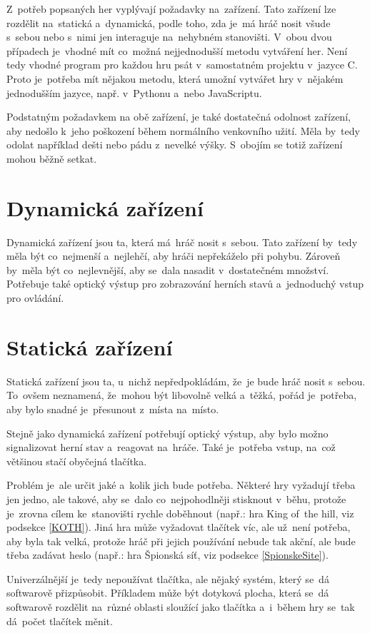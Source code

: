 Z~potřeb popsaných her vyplývají požadavky na~zařízení.
Tato zařízení lze rozdělit na~statická a~dynamická, podle toho, zda je~má hráč nosit všude s~sebou nebo s~nimi jen interaguje na~nehybném stanovišti.
V~obou dvou případech je~vhodné mít co~možná nejjednodušší metodu vytváření her.
Není tedy vhodné program pro každou hru psát v~samostatném projektu v~jazyce C.
Proto je~potřeba mít nějakou metodu, která umožní vytvářet hry v~nějakém jednodušším jazyce, např. v~Pythonu a~nebo JavaScriptu.

Podstatným požadavkem na obě zařízení, je také dostatečná odolnost zařízení, aby nedošlo k~jeho poškození během normálního venkovního užití.
Měla by~tedy odolat například dešti nebo pádu z~nevelké výšky.
S~obojím se totiž zařízení mohou běžně setkat.

\section{Dynamická zařízení}
Dynamická zařízení jsou ta, která má~hráč nosit s~sebou.
Tato zařízení by~tedy měla být co~nejmenší a~nejlehčí, aby hráči nepřekáželo při pohybu.
Zároveň by~měla být co~nejlevnější, aby se~dala nasadit v~dostatečném množství.
Potřebuje také optický výstup pro zobrazování herních stavů a~jednoduchý vstup pro ovládání. 

\section{Statická zařízení}
Statická zařízení jsou ta, u~nichž nepředpokládám, že~je bude hráč nosit s~sebou.
To~ovšem neznamená, že~mohou být libovolně velká a~těžká, pořád je~potřeba, aby bylo snadné je~přesunout z~místa na~místo.

Stejně jako dynamická zařízení potřebují optický výstup, aby bylo možno signalizovat herní stav a~reagovat na~hráče.
Také je~potřeba vstup, na~což většinou stačí obyčejná tlačítka.

Problém je~ale určit jaké a~kolik jich bude potřeba.
Některé hry vyžadují třeba jen jedno, ale takové, aby se~dalo co~nejpohodlněji stisknout v~běhu, protože je~zrovna cílem ke~stanovišti rychle doběhnout (např.: hra King of~the hill, viz podsekce \ref{KOTH}).
Jiná hra může vyžadovat tlačítek víc, ale už~není potřeba, aby byla tak velká, protože hráč při jejich používání nebude tak akční, ale bude třeba zadávat heslo (např.:  hra Špionská síť, viz podsekce \ref{SpionskeSite}).

Univerzálnější je~tedy nepoužívat tlačítka, ale nějaký systém, který se~dá softwarově přizpůsobit.
Příkladem může být dotyková plocha, která se~dá softwarově rozdělit na~různé oblasti sloužící jako tlačítka a~i~během hry se~tak dá~počet tlačítek měnit.

